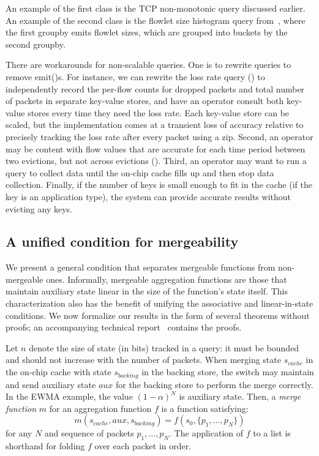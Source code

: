An example of the first class is the TCP non-monotonic query discussed earlier.
An example of the second class is the flowlet size histogram
query from~, where the first {\ct groupby} emits
flowlet sizes, which are grouped into buckets by the second {\ct groupby}.

There are workarounds for non-scalable queries. One is to rewrite queries to
remove {\ct emit()}s.  For instance, we can rewrite the loss rate query
() to independently record the per-flow counts for
dropped packets and total number of packets in separate key-value stores, and
have an operator consult both key-value stores every time they need the loss
rate. Each key-value store can be scaled, but the implementation comes at a
transient loss of accuracy relative to precisely tracking the loss rate after
every packet using a {\ct zip.} Second, an operator may be content with flow
values that are accurate for each time period between two evictions, but not
across evictions (). Third, an operator may want to run a
query to collect data until the on-chip cache fills up and then stop data
collection.  Finally, if the number of keys is small enough to fit in the cache
(\eg if the key is an application type), the system can provide accurate
results without evicting any keys.

\subsection{A unified condition for mergeability}
\label{sec:unifies}
We present a general condition that separates mergeable functions from
non-mergeable ones.
Informally, mergeable aggregation functions are those that maintain auxiliary state
linear in the size
of the function's state itself.
This characterization also has the benefit of unifying the associative and
linear-in-state conditions.
We now formalize
our results in the form of several theorems without proofs; an accompanying
technical report~\cite{theory-tr} contains the proofs.

Let $n$ denote the size of state (in bits) tracked in a \TheSystem query: it must be
bounded and should not increase with the number of packets.  When merging state
$s_{cache}$ in the on-chip cache with state $s_{backing}$ in the backing store, the
switch may maintain and send auxiliary state $aux$  for the backing store to
perform the merge correctly.
In the EWMA example, the value
$(1-\alpha)^N$ is auxiliary state.
Then, a \emph{merge function} $m$ for an
aggregation function $f$ is a function satisfying:
\[ m(s_{cache}, aux, s_{backing}) = f(s_0, \{p_1, \ldots, p_N\}) \]
for any $N$ and sequence of packets $p_1, \ldots, p_N$. The application of $f$
to a list is shorthand for folding $f$ over each packet in order.

